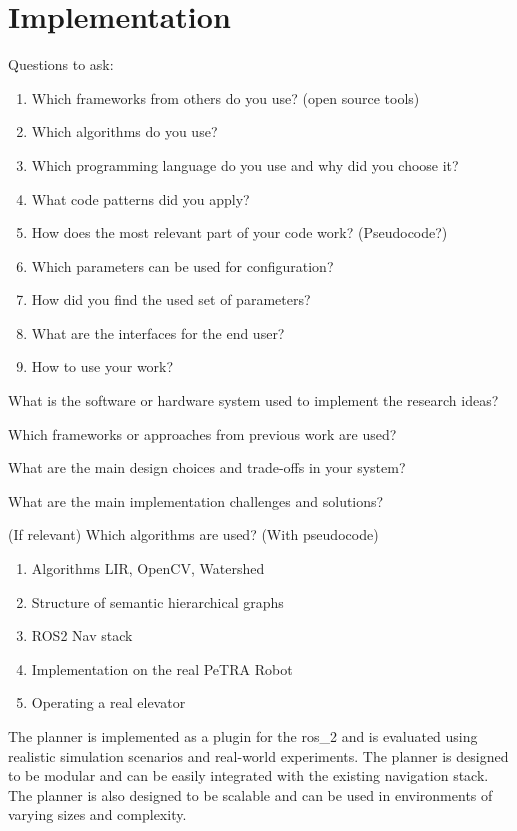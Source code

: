 \chapter{Implementation}
\label{sec:implementation}
Questions to ask:
\begin{enumerate}
    \item Which frameworks from others do you use? (open source tools)
    \item Which algorithms do you use?
    \item Which programming language do you use and why did you choose it?
    \item What code patterns did you apply?
    \item How does the most relevant part of your code work? (Pseudocode?)
    \item Which parameters can be used for configuration?
    \item How did you find the used set of parameters?   
    \item What are the interfaces for the end user?
    \item How to use your work?
\end{enumerate}

What is the software or hardware system used to implement the research ideas? 

Which frameworks or approaches from previous work are used? 

What are the main design choices and trade-offs in your system? 

What are the main implementation challenges and solutions? 

(If relevant) Which algorithms are used? (With pseudocode) 

\begin{enumerate}
    \item Algorithms LIR, OpenCV, Watershed
    \item Structure of semantic hierarchical graphs
    \item ROS2 Nav stack
    \item Implementation on the real PeTRA Robot
    \item Operating a real elevator 
\end{enumerate}

The planner is implemented as a plugin for the \gls{ros_2} and is evaluated using realistic simulation scenarios and real-world experiments. The planner is designed to be modular and can be easily integrated with the existing navigation stack. The planner is also designed to be scalable and can be used in environments of varying sizes and complexity.

